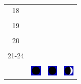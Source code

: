 \documentclass[a4paper,12pt, tikz]{scrartcl}
\begin{document}
\begin{tabularx}{\linewidth}{|c|X|X|X|}
      \hline
      18&   &       &    \\
        &   &       &    \\
      \hline
      19&   &       &    \\
        &   &       &    \\
      \hline
      20&   &       &    \\
        &   &       &    \\
      \hline
      21-24&   &       &    \\
        &   &       &    \\
      \hline  
      & \vspace{0.01cm} \centerline{\includegraphics[width=0.5cm]{moon_phases/Moon_phase_0.svg.png}} \vspace{0.1cm} & \vspace{0.01cm} \centerline{\includegraphics[width=0.5cm]{moon_phases/Moon_phase_0.svg.png}} \vspace{0.1cm} & \vspace{0.01cm} \centerline{\includegraphics[width=0.5cm]{moon_phases/Moon_phase_1.svg.png}} \vspace{0.1cm}\\
      \hline   
    \end{tabularx}




    \newpage

        \noindent
\end{document}
